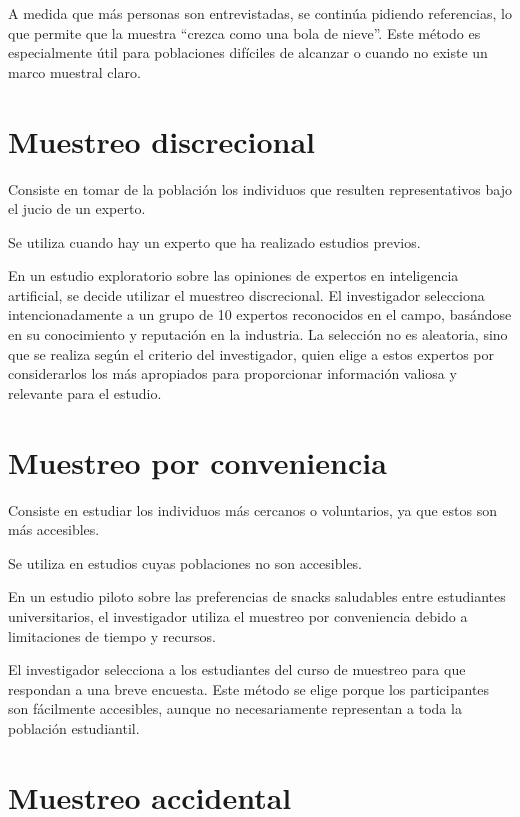 \documentclass[
  letterpaper,
  DIV=11,
  numbers=noendperiod]{scrreprt}
\begin{document}
A medida que más personas son entrevistadas, se continúa pidiendo
referencias, lo que permite que la muestra ``crezca como una bola de
nieve''. Este método es especialmente útil para poblaciones difíciles de
alcanzar o cuando no existe un marco muestral claro.

\section{Muestreo discrecional}\label{muestreo-discrecional}

Consiste en tomar de la población los individuos que resulten
representativos bajo el jucio de un experto.

Se utiliza cuando hay un experto que ha realizado estudios previos.

En un estudio exploratorio sobre las opiniones de expertos en
inteligencia artificial, se decide utilizar el muestreo discrecional. El
investigador selecciona intencionadamente a un grupo de 10 expertos
reconocidos en el campo, basándose en su conocimiento y reputación en la
industria. La selección no es aleatoria, sino que se realiza según el
criterio del investigador, quien elige a estos expertos por
considerarlos los más apropiados para proporcionar información valiosa y
relevante para el estudio.

\section{Muestreo por conveniencia}\label{muestreo-por-conveniencia}

Consiste en estudiar los individuos más cercanos o voluntarios, ya que
estos son más accesibles.

Se utiliza en estudios cuyas poblaciones no son accesibles.

En un estudio piloto sobre las preferencias de snacks saludables entre
estudiantes universitarios, el investigador utiliza el muestreo por
conveniencia debido a limitaciones de tiempo y recursos.

El investigador selecciona a los estudiantes del curso de muestreo para
que respondan a una breve encuesta. Este método se elige porque los
participantes son fácilmente accesibles, aunque no necesariamente
representan a toda la población estudiantil.

\section{Muestreo accidental}\label{muestreo-accidental}
\end{document}
